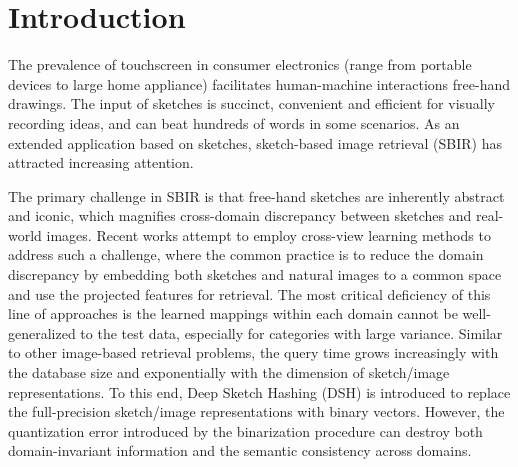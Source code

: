 \documentclass[runningheads]{llncs}
\begin{document}
\section{Introduction}
The prevalence of touchscreen in consumer electronics (range from portable devices to large home appliance) facilitates human-machine interactions free-hand drawings. The input of sketches is succinct, convenient and efficient for visually recording ideas, and can beat hundreds of words in some scenarios. As an extended application based on sketches,  sketch-based image retrieval (SBIR) \cite{SaavedraB10,sketchanet,2012sketchhash,Yu2016shoes,SangkloyBHH16,SongYSXH17,EitzHBA10} has attracted increasing attention. 



The primary challenge in SBIR is that free-hand sketches are inherently abstract and iconic, which magnifies cross-domain discrepancy between sketches and real-world images. Recent works attempt to employ cross-view learning methods \cite{SaavedraB10,EitzHBA10,LiuSSLS17,SaavedraB15,hu2010,ParuiM14,dalal2005,hu2010_1,Saavedra14,Lowe99} to address such a challenge, where the common practice is to reduce the domain discrepancy by embedding both sketches and natural images to a common space and use the projected features for retrieval. The most critical deficiency of this line of approaches is the learned mappings within each domain cannot be well-generalized to the test data, especially for categories with large variance. Similar to other image-based retrieval problems, the query time grows increasingly with the database size and exponentially with the dimension of sketch/image representations. To this end, Deep Sketch Hashing (DSH) \cite{LiuSSLS17} is introduced to replace the full-precision sketch/image representations with binary vectors. However, the quantization error introduced by the binarization procedure can destroy both domain-invariant information and the semantic consistency across domains. 
\end{document}
